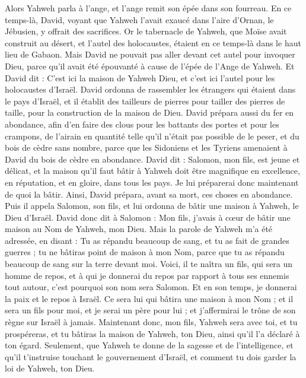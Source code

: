 \begin{multicols}{2}
Alors Yahweh parla à l'ange, et l'ange remit son épée dans son fourreau.
En ce temps-là, David, voyant que Yahweh l'avait exaucé dans l'aire d'Ornan, le Jébusien, y offrait des sacrifices.
Or le tabernacle de Yahweh, que Moïse avait construit au désert, et l'autel des holocaustes, étaient en ce temps-là dans le haut lieu de Gabaon.
Mais David ne pouvait pas aller devant cet autel pour invoquer Dieu, parce qu'il avait été épouvanté à cause de l'épée de l'Ange de Yahweh.
\VerseOne{}Et David dit : C'est ici la maison de Yahweh Dieu, et c'est ici l'autel pour les holocaustes d'Israël.
David ordonna de rassembler les étrangers qui étaient dans le pays d'Israël, et il établit des tailleurs de pierres pour tailler des pierres de taille, pour la construction de la maison de Dieu.
David prépara aussi du fer en abondance, afin d'en faire des clous pour les battants des portes et pour les crampons, de l'airain en quantité telle qu'il n'était pas possible de le peser,
et du bois de cèdre sans nombre, parce que les Sidoniens et les Tyriens amenaient à David du bois de cèdre en abondance.
David dit : Salomon, mon fils, est jeune et délicat, et la maison qu'il faut bâtir à Yahweh doit être magnifique en excellence, en réputation, et en gloire, dans tous les pays. Je lui préparerai donc maintenant de quoi la bâtir. Ainsi, David prépara, avant sa mort, ces choses en abondance.
Puis il appela Salomon, son fils, et lui ordonna de bâtir une maison à Yahweh, le Dieu d'Israël.
David donc dit à Salomon : Mon fils, j'avais à cœur de bâtir une maison au Nom de Yahweh, mon Dieu.
Mais la parole de Yahweh m'a été adressée, en disant : Tu as répandu beaucoup de sang, et tu as fait de grandes guerres ; tu ne bâtiras point de maison à mon Nom, parce que tu as répandu beaucoup de sang sur la terre devant moi.
Voici, il te naîtra un fils, qui sera un homme de repos, et à qui je donnerai du repos par rapport à tous ses ennemis tout autour, c'est pourquoi son nom sera Salomon. Et en son temps, je donnerai la paix et le repos à Israël.
Ce sera lui qui bâtira une maison à mon Nom ; et il sera un fils pour moi, et je serai un père pour lui ; et j'affermirai le trône de son règne sur Israël à jamais.
Maintenant donc, mon fils, Yahweh sera avec toi, et tu prospéreras, et tu bâtiras la maison de Yahweh, ton Dieu, ainsi qu'il l'a déclaré à ton égard.
Seulement, que Yahweh te donne de la sagesse et de l'intelligence, et qu'il t'instruise touchant le gouvernement d'Israël, et comment tu dois garder la loi de Yahweh, ton Dieu.

\end{multicols}
